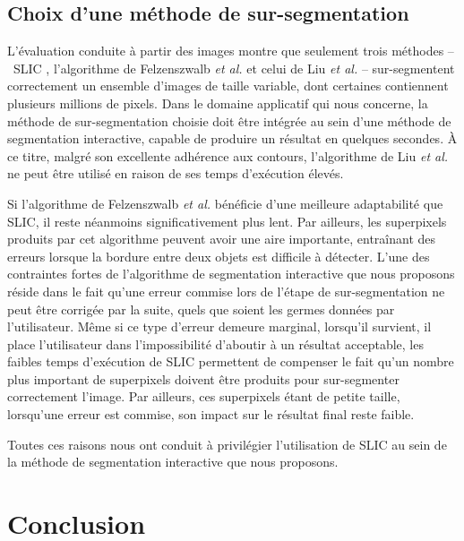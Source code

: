 \subsection{Choix d'une méthode de sur-segmentation}

L'évaluation conduite à partir des images  montre que seulement trois méthodes --~SLIC \cite{achanta2012slic}, l'algorithme de Felzenszwalb \textit{et al.} \cite{felzenszwalb2004efficient} et celui de Liu \textit{et al.} \cite{liu2011entropy} -- sur-segmentent correctement un ensemble d'images de taille variable, dont certaines contiennent plusieurs millions de pixels. Dans le domaine applicatif qui nous concerne, la méthode de sur-segmentation choisie doit être intégrée au sein d'une méthode de segmentation interactive, capable de produire un résultat en quelques secondes. À ce titre, malgré son excellente adhérence aux contours, l'algorithme de Liu \textit{et al.} \cite{liu2011entropy} ne peut être utilisé en raison de ses temps d'exécution élevés. 

Si l'algorithme de Felzenszwalb \textit{et al.} \cite{felzenszwalb2004efficient} bénéficie d'une meilleure adaptabilité que SLIC, il reste néanmoins significativement plus lent. Par ailleurs, les superpixels produits par cet algorithme peuvent avoir une aire importante, entraînant des erreurs  lorsque la bordure entre deux objets est difficile à détecter. L'une des contraintes fortes de l'algorithme de segmentation interactive que nous proposons réside dans le fait qu'une erreur commise lors de l'étape de sur-segmentation ne peut être corrigée par la suite, quels que soient les germes données par l'utilisateur. Même si ce type d'erreur demeure marginal, lorsqu'il survient, il place l'utilisateur dans l'impossibilité d'aboutir à un résultat acceptable, les faibles temps d'exécution de SLIC permettent de compenser le fait qu'un nombre plus important de superpixels doivent être produits pour sur-segmenter correctement l'image. Par ailleurs, ces superpixels étant de petite taille, lorsqu'une erreur est commise, son impact sur le résultat final reste faible.

Toutes ces raisons nous ont conduit à privilégier l'utilisation de SLIC au sein de la méthode de segmentation interactive que nous proposons.

\section{Conclusion}

